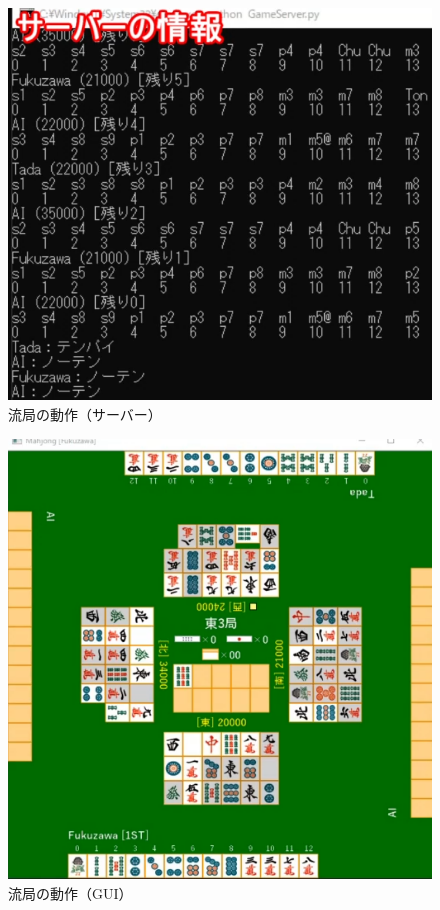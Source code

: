 \documentclass[a4j,titlepage]{jsarticle}
\begin{document}
\begin{figure}[H]
  \centering
  \includegraphics[scale = 0.7]{images/ryukyoku_server.png}
  \caption{流局の動作（サーバー）}
  \label{fig:ryukyoku_server}
\end{figure}

\begin{figure}[H]
  \centering
  \includegraphics[scale = 0.8]{images/ryukyoku_gui.png}
  \caption{流局の動作（GUI）}
  \label{fig:ryukyoku_gui}
\end{figure}
\end{document}
